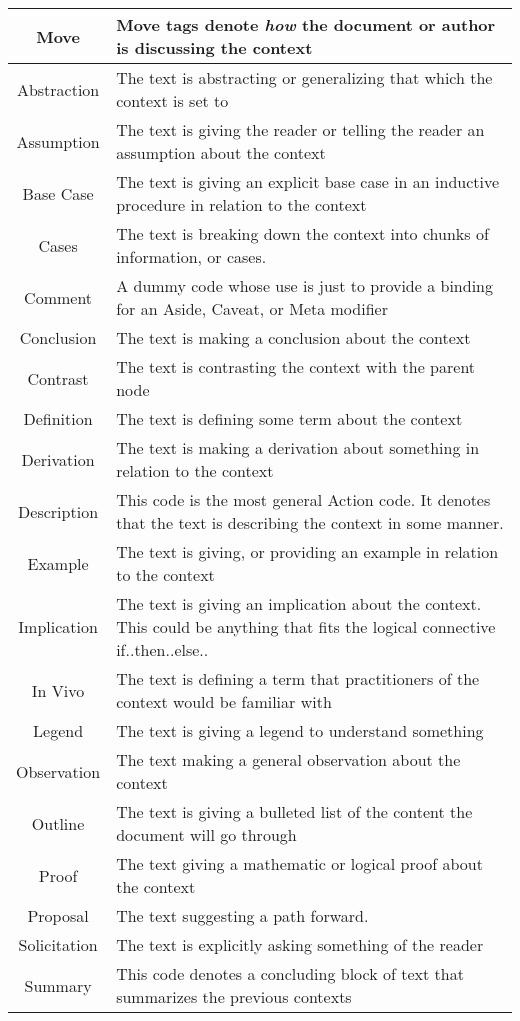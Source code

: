 \begin{table}[h!]
\begin{tabular}{c p{1.8\linewidth}}
    
    \textbf{Move} & Move tags denote \emph{how} the document or author is discussing the context\\
    \hline
    Abstraction & The text is abstracting or generalizing that which the context is set to\\
    Assumption & The text is giving the reader or telling the reader an assumption about the context \\
    Base Case & The text is giving an explicit base case in an inductive procedure in relation to the context\\
    Cases & The text is breaking down the context into chunks of information, or cases.\\
    Comment & A dummy code whose use is just to provide a binding for an Aside, Caveat, or Meta modifier\\
    Conclusion & The text is making a conclusion about the context\\
    Contrast &  The text is contrasting the context with the parent node \\
    Definition & The text is defining some term about the context\\
    Derivation & The text is making a derivation about something in relation to the context\\
    Description & This code is the most general Action code. It denotes that the text is describing the context in some manner.\\
    Example & The text is giving, or providing an example in relation to the context\\
    Implication & The text is giving an implication about the context. This could be anything that fits the logical connective if..then..else..\\
    In Vivo & The text is defining a term that practitioners of the context would be familiar with\\
    Legend & The text is giving a legend to understand something\\
    Observation & The text making a general observation about the context\\
    Outline & The text is giving a bulleted list of the content the document will go through\\
    Proof & The text giving a mathematic or logical proof about the context\\
    Proposal & The text suggesting a path forward.\\
    Solicitation & The text is explicitly asking something of the reader\\
    Summary & This code denotes a concluding block of text that summarizes the previous contexts\\


\end{tabular}
\end{table}
